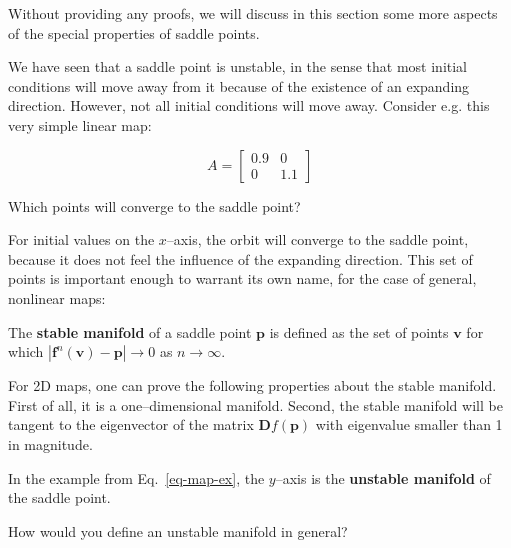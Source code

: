 \pagebreak


Without providing any proofs, we will discuss in this section some more aspects of the special properties of saddle points.

We have seen that a saddle point is unstable, in the sense that most initial conditions will move away from it because of the existence of an expanding direction. However, not all initial conditions will move away. Consider e.g. this very simple linear map:

\begin{equation}
A =
\begin{bmatrix}
0.9 & 0 \\
0 & 1.1
\end{bmatrix} 
\label{eq-map-ex}
\end{equation} 

\begin{cue}
Which points will converge to the saddle point? 
\end{cue}

For initial values on the $x$--axis, the orbit will converge to the saddle point, because it does not feel the influence of the expanding direction. This set of points is important enough to warrant its own name, for the case of general, nonlinear maps:

The \textbf{stable manifold} of a saddle point ${\mathbf p}$ is defined as the set of points ${\mathbf v}$ for which $|{\mathbf f}^n({\mathbf v}) - {\mathbf p} | \to 0$ as $ n \to \infty$.

\noindent{}For 2D maps, one can prove the following properties about the stable manifold. First of all, it is a one--dimensional manifold. Second, the stable manifold will be tangent to the eigenvector of the matrix ${\mathbf Df}({\mathbf p})$ with eigenvalue smaller than 1 in magnitude.

In the example from Eq.~\ref{eq-map-ex}, the $y$--axis is the \textbf{unstable manifold} of the saddle point.

\begin{cue}
How would you define an unstable manifold in general?  
\end{cue}

